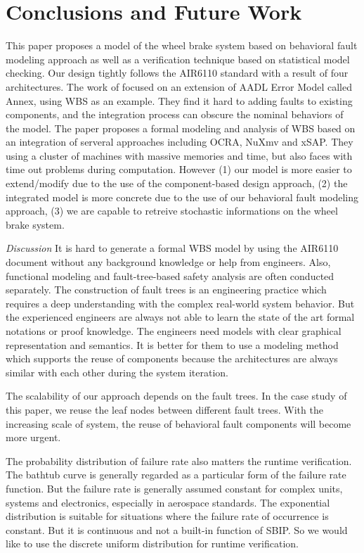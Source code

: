 \documentclass[runningheads]{llncs}
\begin{document}




\section{Conclusions and Future Work}
This paper proposes a model of the wheel brake system based on behavioral fault modeling approach as well as a verification technique based on statistical model checking. Our design tightly follows the AIR6110 standard with a result of four architectures. The work of\cite{aadl14}\cite{aadl} focused on an extension of AADL Error Model called Annex, using WBS as an example. They find it hard to adding faults to existing components, and the integration process can obscure the nominal behaviors of the model. The paper\cite{cav15} proposes a formal modeling and analysis of WBS based on an integration of serveral approaches including OCRA, NuXmv and xSAP. They using a cluster of machines with massive memories and time, but also faces with time out problems during computation. However (1) our model is more easier to extend/modify due to the use of the component-based design approach, (2) the integrated model is more concrete due to the use of our behavioral fault modeling approach, (3) we are capable to retreive stochastic informations on the wheel brake system.

\emph{Discussion} It is hard to generate a formal WBS model by using the AIR6110 document without any background knowledge or help from engineers. Also, functional modeling and fault-tree-based safety analysis are often conducted separately.  The construction of fault trees is an engineering practice which requires a deep understanding with the complex real-world system behavior. But the experienced engineers are always not able to learn the state of the art formal notations or proof knowledge. The engineers need models with clear graphical representation and semantics. It is better for them to use a modeling method which supports the reuse of components because the architectures are always similar with each other during the system iteration.

The scalability of our approach depends on the fault trees. In the case study of this paper, we reuse the leaf nodes between different fault trees. With the increasing scale of system, the reuse of behavioral fault components will become more urgent.

The probability distribution of failure rate also matters the runtime verification. The bathtub curve is generally regarded as a particular form of the failure rate function. But the failure rate is generally assumed constant for complex units, systems and electronics, especially in aerospace standards. The exponential distribution is suitable for situations where the failure rate of occurrence is constant. But it is continuous and not a built-in function of SBIP. So we would like to use the discrete uniform distribution for runtime verification.
\end{document}
